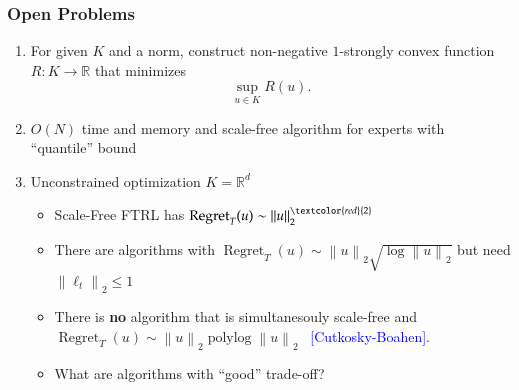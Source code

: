 \documentclass[usenames,dvipsnames]{beamer}
\DeclareMathOperator{\Regret}{Regret}
\DeclareMathOperator{\polylog}{polylog}
\newcommand{\R}{\mathbb{R}}
\newcommand{\norm}[1]{\left\|#1\right\|}
\newcommand{\Cite}[1]{{\tiny \textcolor{Blue}{[#1]}}}
\begin{document}
\begin{frame}
\frametitle{Open Problems}

\begin{enumerate}
\item For given $K$ and a norm, construct non-negative $1$-strongly convex
function $R:K \to \R$ that minimizes
$$
\sup_{u \in K} R(u).
$$

\item $O(N)$ time and memory and scale-free algorithm
for experts with ``quantile'' bound

\item Unconstrained optimization $K=\R^d$

\begin{itemize}
\item Scale-Free FTRL has $\Regret_T(u) \sim \norm{u}_2^{\textcolor{red}{2}}$
\item There are algorithms with $\Regret_T(u) \sim \norm{u}_2 \sqrt{\log \norm{u}_2}$ but need $\norm{\ell_t}_2 \le 1$
\item There is \textbf{no} algorithm that is simultanesouly scale-free
and $\Regret_T(u) \sim \norm{u}_2 \polylog{\norm{u}_2}$ \ \Cite{Cutkosky-Boahen}.
\item What are algorithms with ``good'' trade-off?
\end{itemize}

\end{enumerate}

\end{frame}
\end{document}

